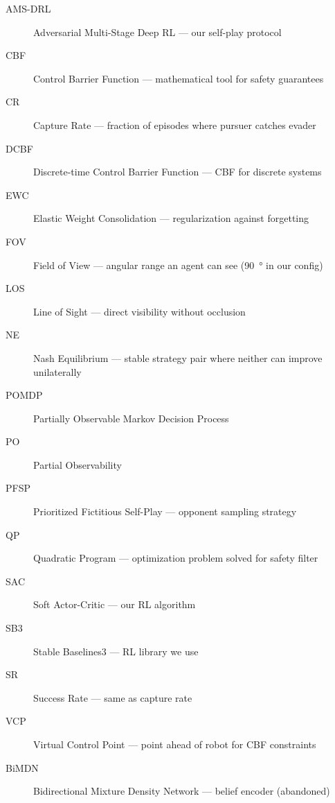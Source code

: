 \documentclass[11pt,a4paper]{report}
\begin{document}
\begin{description}
    \item[AMS-DRL] Adversarial Multi-Stage Deep RL --- our self-play protocol
    \item[CBF] Control Barrier Function --- mathematical tool for safety guarantees
    \item[CR] Capture Rate --- fraction of episodes where pursuer catches evader
    \item[DCBF] Discrete-time Control Barrier Function --- CBF for discrete systems
    \item[EWC] Elastic Weight Consolidation --- regularization against forgetting
    \item[FOV] Field of View --- angular range an agent can see (\SI{90}{\degree} in our config)
    \item[LOS] Line of Sight --- direct visibility without occlusion
    \item[NE] Nash Equilibrium --- stable strategy pair where neither can improve unilaterally
    \item[POMDP] Partially Observable Markov Decision Process
    \item[PO] Partial Observability
    \item[PFSP] Prioritized Fictitious Self-Play --- opponent sampling strategy
    \item[QP] Quadratic Program --- optimization problem solved for safety filter
    \item[SAC] Soft Actor-Critic --- our RL algorithm
    \item[SB3] Stable Baselines3 --- RL library we use
    \item[SR] Success Rate --- same as capture rate
    \item[VCP] Virtual Control Point --- point ahead of robot for CBF constraints
    \item[BiMDN] Bidirectional Mixture Density Network --- belief encoder (abandoned)
\end{description}
\end{document}
